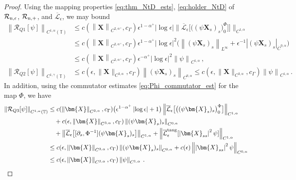 \documentclass[11pt,reqno]{amsart}
\newcommand{\T}{\mathbb{T}}
\newcommand{\X}{\bm{X}}
\newcommand{\p}{\partial}
\newcommand{\abs}[1]{\left\lvert #1 \right\rvert}
\newcommand{\norm}[1]{\left\lVert #1 \right\rVert}
\newcommand{\mc}[1]{\mathcal{#1}}
\theoremstyle{definition}
\begin{document}
\begin{proof}
Using the mapping properties \eqref{eq:thm_NtD_ests}, \eqref{eq:holder_NtD} of $\mc{R}_{\rm n,\epsilon}$, $\mc{R}_{\rm n,+}$, and $\overline{\mc{L}}_\epsilon$, we may bound
\begin{equation}
\begin{aligned}
  \norm{\mc{R}_{Q1}[\psi]}_{C^{1,\alpha}(\T)} &\le c(\norm{\X}_{C^{2,\alpha^+}},c_\Gamma)\epsilon^{1-\alpha^+}\abs{\log\epsilon}\|\overline{\mc{L}}_\epsilon\big[\big((\psi\X_s)_s \big)_0^\Phi\big]\big]\|_{C^{1,\alpha}} \\
  &\le c(\norm{\X}_{C^{2,\alpha^+}},c_\Gamma)\epsilon^{1-\alpha^+}\abs{\log\epsilon}^2\big( \norm{(\psi\X_s)_s}_{L^\infty} + \epsilon^{-1}\abs{(\psi\X_s)_s}_{\dot C^{0,\alpha}}\big)\\
  &\le c(\norm{\X}_{C^{2,\alpha^+}},c_\Gamma)\epsilon^{-\alpha^+}\abs{\log\epsilon}^2\norm{\psi}_{C^{1,\alpha}} \,,\\
%
%
  \norm{\mc{R}_{Q2}[\psi]}_{C^{1,\gamma}(\T)} &\le 
  c(\epsilon,\|\X\|_{C^{3,\alpha}},c_\Gamma)\norm{(\psi\X_s)_s}_{C^{0,\alpha}} 
  \le c(\epsilon,\|\X\|_{C^{3,\alpha}},c_\Gamma)\norm{\psi}_{C^{1,\alpha}}\,.
\end{aligned}
\end{equation}
%
%
In addition, using the commutator estimates \eqref{eq:Phi_commutator_est} for the map $\Phi$, we have 
\begin{equation}
\begin{aligned}
  \norm{\mc{R}_{Q3}[\psi]}_{C^{1,\alpha}(\T)} &\le 
  c(\norm{\X}_{C^{3,\alpha}},c_\Gamma) \big(\epsilon^{1-\alpha^+}\abs{\log\epsilon}+1\big)\norm{\overline{\mc{L}}_\epsilon\big[\big((\psi\X_s)_s \big)_0^\Phi\big]}_{C^{1,\alpha}}\\
  &\quad 
  + c(\epsilon,\norm{\X}_{C^{3,\alpha}},c_\Gamma)\norm{(\psi\X_s)_s}_{C^{0,\alpha}} \\
  &\quad 
  + \norm{\overline{\mc{L}}_\epsilon\big[[\p_s,\Phi^{-1}](\psi\X_s)_s\big]}_{C^{1,\alpha}}
  +\norm{\overline{\mc{L}}_\epsilon^{\rm tang}[\abs{\X_{ss}}^2\psi]}_{C^{1,\alpha}}\\
  &\le c(\epsilon,\norm{\X}_{C^{3,\alpha}},c_\Gamma) \norm{(\psi\X_s)_s}_{C^{0,\alpha}} +c(\epsilon)\norm{\abs{\X_{ss}}^2\psi}_{C^{0,\alpha}}\\
  &\le c(\epsilon,\norm{\X}_{C^{3,\alpha}},c_\Gamma)\norm{\psi}_{C^{1,\alpha}}\,.
\end{aligned}
\end{equation}



\end{proof}
\end{document}
